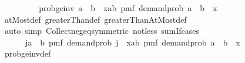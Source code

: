 \begin{isabellebody}
\ \ \ \ \isamarkupfalse%
\ \isamarkupfalse%
\ {\isachardoublequoteopen}{\isasymdots}\ {\isacharequal}{\kern0pt}\ prob{\isacharunderscore}{\kern0pt}ge{\isacharunderscore}{\kern0pt}inv\ {\isacharparenleft}{\kern0pt}a\ {\isacharplus}{\kern0pt}\ b{\isacharparenright}{\kern0pt}\ {\isacharplus}{\kern0pt}\ {\isacharparenleft}{\kern0pt}{\isasymSum}x{\isasymin}{\isacharbraceleft}{\kern0pt}{}{\isacharless}{\kern0pt}{\isachardot}{\kern0pt}{\isachardot}{\kern0pt}a{\isacharplus}{\kern0pt}b{\isacharbraceright}{\kern0pt}{\isachardot}{\kern0pt}\ {\isacharparenleft}{\kern0pt}pmf\ demand{\isacharunderscore}{\kern0pt}prob\ {\isacharparenleft}{\kern0pt}a\ {\isacharplus}{\kern0pt}\ b\ {\isacharminus}{\kern0pt}\ x{\isacharparenright}{\kern0pt}{\isacharparenright}{\kern0pt}{\isacharparenright}{\kern0pt}{\isachardoublequoteclose}\isanewline
\ \ \ \ \ \ \isamarkupfalse%
\ atMost{\isacharunderscore}{\kern0pt}def\ greaterThan{\isacharunderscore}{\kern0pt}def\ greaterThanAtMost{\isacharunderscore}{\kern0pt}def\isanewline
\ \ \ \ \ \ \isamarkupfalse%
\ {\isacharparenleft}{\kern0pt}auto\ simp{\isacharcolon}{\kern0pt}\ Collect{\isacharunderscore}{\kern0pt}neg{\isacharunderscore}{\kern0pt}eq{\isacharbrackleft}{\kern0pt}symmetric{\isacharbrackright}{\kern0pt}\ not{\isacharunderscore}{\kern0pt}less\ sum{\isachardot}{\kern0pt}If{\isacharunderscore}{\kern0pt}cases{\isacharparenright}{\kern0pt}\isanewline
\ \ \ \ \isamarkupfalse%
\ \isamarkupfalse%
\ {\isachardoublequoteopen}{\isasymdots}\ {\isacharequal}{\kern0pt}\ \ {}\ {\isacharminus}{\kern0pt}\ {\isacharparenleft}{\kern0pt}{\isasymSum}j{\isacharless}{\kern0pt}{\isacharparenleft}{\kern0pt}a\ {\isacharplus}{\kern0pt}\ b{\isacharparenright}{\kern0pt}{\isachardot}{\kern0pt}\ pmf\ demand{\isacharunderscore}{\kern0pt}prob\ j{\isacharparenright}{\kern0pt}\ {\isacharplus}{\kern0pt}\ {\isacharparenleft}{\kern0pt}{\isasymSum}x{\isasymin}{\isacharbraceleft}{\kern0pt}{}{\isacharless}{\kern0pt}{\isachardot}{\kern0pt}{\isachardot}{\kern0pt}a{\isacharplus}{\kern0pt}b{\isacharbraceright}{\kern0pt}{\isachardot}{\kern0pt}\ pmf\ demand{\isacharunderscore}{\kern0pt}prob\ {\isacharparenleft}{\kern0pt}a\ {\isacharplus}{\kern0pt}\ b\ {\isacharminus}{\kern0pt}\ x{\isacharparenright}{\kern0pt}{\isacharparenright}{\kern0pt}{\isachardoublequoteclose}\isanewline
\ \ \ \ \ \ \isamarkupfalse%
\ prob{\isacharunderscore}{\kern0pt}ge{\isacharunderscore}{\kern0pt}inv{\isacharunderscore}{\kern0pt}def\isanewline

\end{isabellebody}
